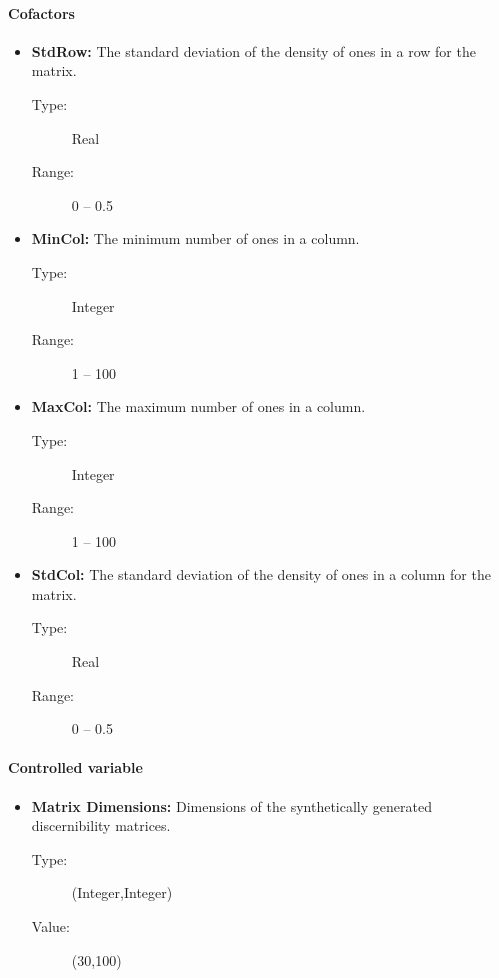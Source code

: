 \documentclass[11pt]{article}   %
\begin{document}
    \paragraph{Cofactors}  
  	\begin{itemize}
  	   \item \textbf{StdRow:} The standard deviation of the density of ones in a row for the matrix.
  	   		\begin{description}
  	   			\item[Type:] Real
  	   			\item[Range:] 0 -- 0.5
  	   		\end{description}
  	   \item \textbf{MinCol:} The minimum number of ones in a column.
  	   		\begin{description}
  	   			\item[Type:] Integer
  	   			\item[Range:] 1 -- 100
  	   		\end{description}
  	   \item \textbf{MaxCol:} The maximum number of ones in a column.
  	   		\begin{description}
  	   			\item[Type:] Integer
  	   			\item[Range:] 1 -- 100
  	   		\end{description}
  	   \item \textbf{StdCol:} The standard deviation of the density of ones in a column for the matrix.
  	   		\begin{description}
  	   			\item[Type:] Real
  	   			\item[Range:] 0 -- 0.5
  	   		\end{description}
    \end{itemize}
    \paragraph{Controlled variable}  
  	\begin{itemize}
  	   \item \textbf{Matrix Dimensions:} Dimensions of the synthetically generated discernibility matrices.
  	   		\begin{description}
  	   			\item[Type:] (Integer,Integer)
  	   			\item[Value:] (30,100)
  	   		\end{description}
    \end{itemize}
\end{document}
